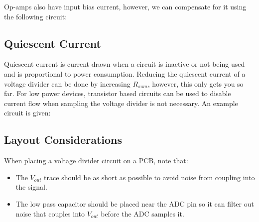 \documentclass[main.tex]{subfiles}
\begin{document}

Op-amps also have input bias current, however, we can compensate for it using the following circuit:


\subsection{Quiescent Current}
Quiescent current is current drawn when a circuit is inactive or not being used and is proportional to power consumption. Reducing the quiescent current of a voltage divider can be done by increasing $R_{sum}$, however, this only gets you so far. For low power devices, transistor based circuits can be used to disable current flow when sampling the voltage divider is not necessary. An example circuit is given:  



\subsection{Layout Considerations}
When placing a voltage divider circuit on a PCB, note that:
\begin{itemize}
    \item The $V_{out}$ trace should be as short as possible to avoid noise from coupling into the signal. 
    \item The low pass capacitor should be placed near the ADC pin so it can filter out noise that couples into $V_{out}$ before the ADC samples it.
\end{itemize}
\end{document}
